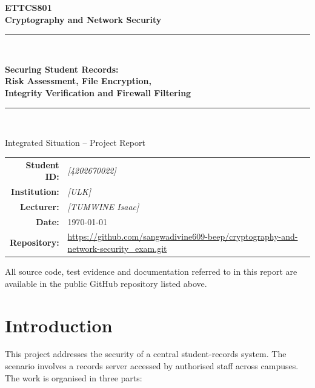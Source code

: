 \documentclass[11pt,a4paper]{article}
\begin{document}
\begin{titlepage}
\centering
\vspace*{1.5cm}
{\Large\bfseries ETTCS801\\[0.3cm] Cryptography and Network Security\par}
\vspace{1cm}
\rule{\textwidth}{1.2pt}\\[0.5cm]
{\Huge\bfseries Securing Student Records:\\[0.2cm]
Risk Assessment, File Encryption,\\[0.2cm]
Integrity Verification and Firewall Filtering\par}
\rule{\textwidth}{1.2pt}\\[1.2cm]

{\large Integrated Situation -- Project Report\par}
\vspace{1.5cm}

{\Large \renewcommand{\arraystretch}{1.4}
\begin{tabular}{rl}
  \textbf{Student ID:}  & \textit{[4202670022]} \\
  \textbf{Institution:} & \textit{[ULK]} \\
  \textbf{Lecturer:}    & \textit{[TUMWINE Isaac]} \\
  \textbf{Date:}        & \today \\
  \textbf{Repository:}  & \url{https://github.com/sangwadivine609-beep/cryptography-and-network-security_exam.git}
\end{tabular}
\par}

\vfill
{\small All source code, test evidence and documentation referred to in this report
are available in the public GitHub repository listed above.\par}
\end{titlepage}

\tableofcontents
\newpage

\section{Introduction}
This project addresses the security of a central student-records system.
The scenario involves a records server accessed by authorised staff across
campuses. The work is organised in three parts:
\end{document}
